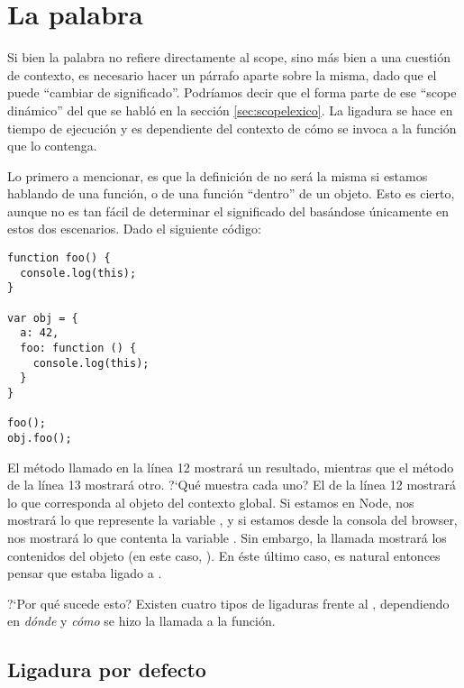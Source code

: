 \section{La palabra }
\label{sec:scopethis}

Si bien la palabra  no refiere directamente al scope, sino más bien a una cuestión de contexto, es necesario hacer un párrafo aparte sobre la misma, dado que el  puede "`cambiar de significado"'. Podríamos decir que el  forma parte de ese "`scope dinámico"' del que se habló en la sección \ref{sec:scopelexico}. La ligadura se hace en tiempo de ejecución y es dependiente del contexto de cómo se invoca a la función que lo contenga.

Lo primero a mencionar, es que la definición de  no será la misma si estamos hablando de una función, o de una función "`dentro"' de un objeto. Esto es cierto, aunque no es tan fácil de determinar el significado del  basándose únicamente en estos dos escenarios. Dado el siguiente código:

\begin{lstlisting}[title={Analizando \code{this}}]
function foo() {
  console.log(this);
}

var obj = {
  a: 42,
  foo: function () {
    console.log(this);
  }
}

foo();
obj.foo();
\end{lstlisting}

El método  llamado en la línea 12 mostrará un resultado, mientras que el método  de la línea 13 mostrará otro. ?`Qué muestra cada uno? El de la línea 12 mostrará lo que corresponda al objeto del contexto global. Si estamos en Node, nos mostrará lo que represente la variable , y si estamos desde la consola del browser, nos mostrará lo que contenta la variable . Sin embargo, la llamada  mostrará los contenidos del objeto  (en este caso, ). En éste último caso, es natural entonces pensar que  estaba ligado a .

?`Por qué sucede esto? Existen cuatro tipos de ligaduras frente al , dependiendo en \textit{dónde} y \textit{cómo} se hizo la llamada a la función.

\subsection{Ligadura por defecto}

